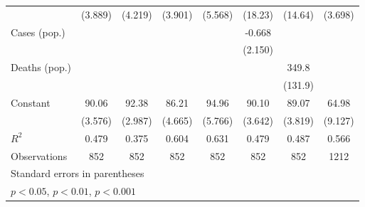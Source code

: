 \documentclass{article}
\begin{document}
{\begin{longtable}{l*{7}{c}}
                &  (3.889)         &  (4.219)         &  (3.901)         &  (5.568)         &  (18.23)         &  (14.64)         &  (3.698)         \\
Cases (pop.)    &                  &                  &                  &                  &   -0.668         &                  &                  \\
                &                  &                  &                  &                  &  (2.150)         &                  &                  \\
Deaths (pop.)   &                  &                  &                  &                  &                  &    349.8\sym{*}  &                  \\
                &                  &                  &                  &                  &                  &  (131.9)         &                  \\
Constant        &    90.06\sym{***}&    92.38\sym{***}&    86.21\sym{***}&    94.96\sym{***}&    90.10\sym{***}&    89.07\sym{***}&    64.98\sym{***}\\
                &  (3.576)         &  (2.987)         &  (4.665)         &  (5.766)         &  (3.642)         &  (3.819)         &  (9.127)         \\
\hline
\(R^{2}\)       &    0.479         &    0.375         &    0.604         &    0.631         &    0.479         &    0.487         &    0.566         \\
Observations    &      852         &      852         &      852         &      852         &      852         &      852         &     1212         \\
\hline\hline
\multicolumn{8}{l}{\footnotesize Standard errors in parentheses}\\
\multicolumn{8}{l}{\footnotesize \sym{*} \(p<0.05\), \sym{**} \(p<0.01\), \sym{***} \(p<0.001\)}\\
\end{longtable}
}
\end{document}
